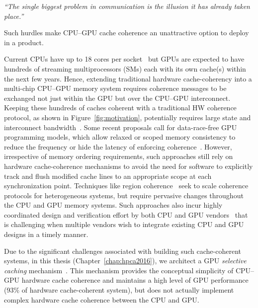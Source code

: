 \begin{centering}
\textit{``The single biggest problem in communication is the illusion it has already
taken place.''}
\end{centering}
Such hurdles make CPU--GPU cache coherence an unattractive option to
deploy in a product.

Current CPUs have up to 18 cores per socket~\cite{INTELXEONE5V3} but GPUs are
expected to have hundreds of streaming multiprocessors (SMs) each with its own
cache(s) within the next few years. Hence, extending traditional hardware
cache-coherency into a multi-chip CPU--GPU memory system requires coherence
messages to be exchanged not just within the GPU but over the CPU--GPU
interconnect. Keeping these hundreds of caches coherent with a traditional HW
coherence protocol, as shown in Figure~\ref{fig:motivation}, potentially
requires large state and interconnect bandwidth~\cite{Kelm2010,johnson2011}.
Some recent proposals call for data-race-free GPU programming models, which
allow relaxed or scoped memory consistency to reduce the frequency or hide the
latency of enforcing coherence~\cite{Hechtman2014}.  However, irrespective of
memory ordering requirements, such approaches still rely on hardware
cache-coherence mechanisms to  avoid the need for software to explicitly track
and flush modified cache lines to an appropriate scope at each synchronization
point. Techniques like region coherence~\cite{Power2013} seek to scale coherence
protocols for heterogeneous systems, but require pervasive changes throughout
the CPU and GPU memory systems.  Such approaches also incur highly coordinated
design and verification effort by both CPU and GPU vendors~\cite{Hong2012} that
is challenging when multiple vendors wish to integrate existing CPU and GPU
designs in a timely manner.

Due to the significant challenges associated with building such cache-coherent
systems, in this thesis (Chapter~\ref{chap:hpca2016}), we architect a GPU
\textit{selective caching} mechanism~\cite{ref:agarwal:hpca2016}.  This
mechanism provides the conceptual simplicity of CPU--GPU hardware cache coherence
and maintains a high level of GPU performance (93\% of hardware cache-coherent
system), but does not actually implement complex hardware cache coherence
between the CPU and GPU.

